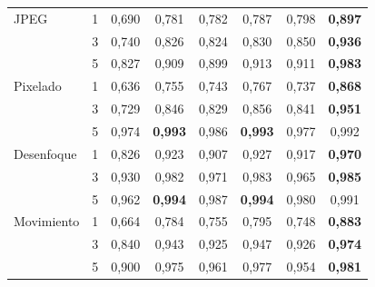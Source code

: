 \begin{table}
\begin{tabular*}{\linewidth}{@{\extracolsep{\fill}}llcccccc}
\addlinespace[2pt]
JPEG & 1 & 0{,}690 & 0{,}781 & 0{,}782 & 0{,}787 & 0{,}798 & \textbf{0{,}897} \\
 & 3 & 0{,}740 & 0{,}826 & 0{,}824 & 0{,}830 & 0{,}850 & \textbf{0{,}936} \\
 & 5 & 0{,}827 & 0{,}909 & 0{,}899 & 0{,}913 & 0{,}911 & \textbf{0{,}983} \\
\addlinespace[2pt]
Pixelado & 1 & 0{,}636 & 0{,}755 & 0{,}743 & 0{,}767 & 0{,}737 & \textbf{0{,}868} \\
 & 3 & 0{,}729 & 0{,}846 & 0{,}829 & 0{,}856 & 0{,}841 & \textbf{0{,}951} \\
 & 5 & 0{,}974 & \textbf{0{,}993} & 0{,}986 & \textbf{0{,}993} & 0{,}977 & 0{,}992 \\
\addlinespace[2pt]
Desenfoque & 1 & 0{,}826 & 0{,}923 & 0{,}907 & 0{,}927 & 0{,}917 & \textbf{0{,}970} \\
 & 3 & 0{,}930 & 0{,}982 & 0{,}971 & 0{,}983 & 0{,}965 & \textbf{0{,}985} \\
 & 5 & 0{,}962 & \textbf{0{,}994} & 0{,}987 & \textbf{0{,}994} & 0{,}980 & 0{,}991 \\
\addlinespace[2pt]
Movimiento & 1 & 0{,}664 & 0{,}784 & 0{,}755 & 0{,}795 & 0{,}748 & \textbf{0{,}883} \\
 & 3 & 0{,}840 & 0{,}943 & 0{,}925 & 0{,}947 & 0{,}926 & \textbf{0{,}974} \\
 & 5 & 0{,}900 & 0{,}975 & 0{,}961 & 0{,}977 & 0{,}954 & \textbf{0{,}981} \\
\bottomrule
\end{tabular*}
\end{table}

